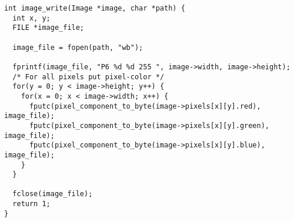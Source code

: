 \begin{lstlisting}[style=Cstyle, caption=light struct]
int image_write(Image *image, char *path) {
  int x, y;
  FILE *image_file;

  image_file = fopen(path, "wb");
  
  fprintf(image_file, "P6 %d %d 255 ", image->width, image->height);
  /* For all pixels put pixel-color */
  for(y = 0; y < image->height; y++) {
    for(x = 0; x < image->width; x++) {
      fputc(pixel_component_to_byte(image->pixels[x][y].red),         image_file);
      fputc(pixel_component_to_byte(image->pixels[x][y].green), image_file);
      fputc(pixel_component_to_byte(image->pixels[x][y].blue), image_file);
    }
  }

  fclose(image_file);
  return 1;
}
\end{lstlisting}



